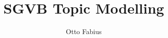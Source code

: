 \documentclass{report}
\author{Otto Fabius}
\title{SGVB Topic Modelling}
\begin{document}
\maketitle
\tableofcontents





\pagebreak 
\nocite{*}


\end{document}
